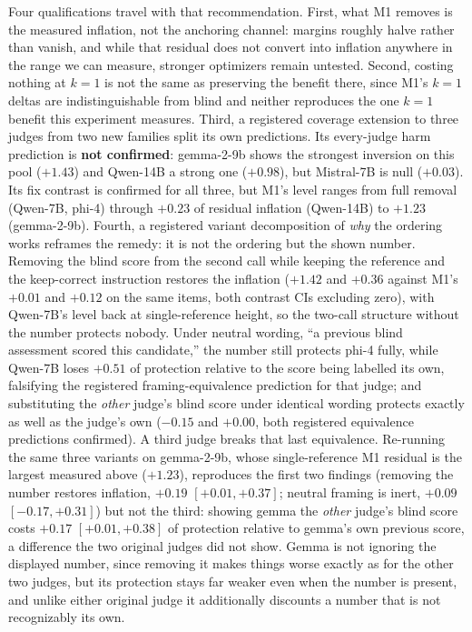 \documentclass[11pt]{article}
\begin{document}
Four qualifications travel with that recommendation.
First, what M1 removes is the measured inflation, not the anchoring channel: margins roughly halve rather than vanish, and while that residual does not convert into inflation anywhere in the range we can measure, stronger optimizers remain untested.
Second, costing nothing at $k{=}1$ is not the same as preserving the benefit there, since M1's $k{=}1$ deltas are indistinguishable from blind and neither reproduces the one $k{=}1$ benefit this experiment measures.
Third, a registered coverage extension to three judges from two new families split its own predictions.
Its every-judge harm prediction is \textbf{not confirmed}: gemma-2-9b shows the strongest inversion on this pool ($+1.43$) and Qwen-14B a strong one ($+0.98$), but Mistral-7B is null ($+0.03$).
Its fix contrast is confirmed for all three, but M1's level ranges from full removal (Qwen-7B, phi-4) through $+0.23$ of residual inflation (Qwen-14B) to $+1.23$ (gemma-2-9b).
Fourth, a registered variant decomposition of \emph{why} the ordering works reframes the remedy: it is not the ordering but the shown number.
Removing the blind score from the second call while keeping the reference and the keep-correct instruction restores the inflation ($+1.42$ and $+0.36$ against M1's $+0.01$ and $+0.12$ on the same items, both contrast CIs excluding zero), with Qwen-7B's level back at single-reference height, so the two-call structure without the number protects nobody.
Under neutral wording, ``a previous blind assessment scored this candidate,'' the number still protects phi-4 fully, while Qwen-7B loses $+0.51$ of protection relative to the score being labelled its own, falsifying the registered framing-equivalence prediction for that judge; and substituting the \emph{other} judge's blind score under identical wording protects exactly as well as the judge's own ($-0.15$ and $+0.00$, both registered equivalence predictions confirmed).
A third judge breaks that last equivalence.
Re-running the same three variants on gemma-2-9b, whose single-reference M1 residual is the largest measured above ($+1.23$), reproduces the first two findings (removing the number restores inflation, $+0.19$ $[+0.01,+0.37]$; neutral framing is inert, $+0.09$ $[-0.17,+0.31]$) but not the third: showing gemma the \emph{other} judge's blind score costs $+0.17$ $[+0.01,+0.38]$ of protection relative to gemma's own previous score, a difference the two original judges did not show.
Gemma is not ignoring the displayed number, since removing it makes things worse exactly as for the other two judges, but its protection stays far weaker even when the number is present, and unlike either original judge it additionally discounts a number that is not recognizably its own.
\end{document}
